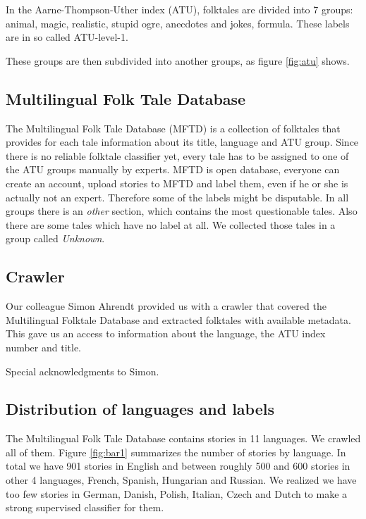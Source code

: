 \documentclass[a4paper]{article}
\begin{document}
In the Aarne-Thompson-Uther index (ATU), folktales are divided into 7 groups: animal, magic, realistic, stupid ogre, anecdotes and jokes, formula. These labels are in so called ATU-level-1.

These groups are then subdivided into another groups, as figure \ref{fig:atu} shows.




\subsection{Multilingual Folk Tale Database}
The Multilingual Folk Tale Database (MFTD) \cite{mftd} is a collection of folktales that provides for each tale information about its title, language and ATU group.
Since there is no reliable folktale classifier yet, every tale has to be assigned to one of the ATU groups manually by experts. 
MFTD is open database, everyone can create an account, upload
stories to MFTD and label them, even if he or she is actually not an expert. Therefore some of the labels might be disputable. In all groups there is an \textit{other} section, which contains the most questionable tales.
Also there are some tales which have no label at all.
We collected those tales in a group called \textit{Unknown}.

\subsection{Crawler}

Our colleague Simon Ahrendt provided us with a crawler that covered the Multilingual Folktale Database and extracted folktales with available metadata. This gave us an access to information about the language, the ATU index number and title.

Special acknowledgments to Simon.

\subsection{Distribution of languages and labels}

The Multilingual Folk Tale Database contains stories in 11 languages. We
crawled all of them. Figure \ref{fig:bar1} summarizes the number of stories
by language. In total we have 901 stories in English and between roughly 500
and 600 stories in other 4 languages, French, Spanish, Hungarian and
Russian. We realized we have too few stories in German, Danish, Polish,
Italian, Czech and Dutch to make a strong supervised classifier for them.
\end{document}
